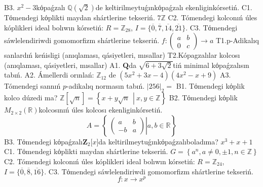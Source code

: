 B3. \(x^{2} - 3\)kόpaǵzalı \(\mathbb{Q}(\sqrt{2})\)de keltirilmeytuǵınkόpaǵzalı ekenliginkórsetiń.
C1. Tόmendegi kόplikti maydan shártlerine tekseriń. \(7\mathbb{Z}\)
C2. Tómendegi kolconıń úles kóplikleri ideal bolıwın kórsetiń:
\(R = \mathbb{Z}_{28}\), \(I = \{\overline{0},\overline{7},\overline{14},\overline{21}\}\).
C3. Tόmendegi sáwlelendiriwdi gomomorfizm shártlerine tekseriń. \(f:\begin{pmatrix}
a & b \\
0 & c
\end{pmatrix} \rightarrow a\)
T1.p-Adikalıq sanlardıń keńisligi (anıqlaması, qásiyetleri, mısallar)
T2.Kópagzalılar kolcosı (anıqlaması, qásiyetleri, mısallar)
A1. \(\mathbf{Q}\)da \(\sqrt{6 + 3\sqrt{2}}\)tiń minimal kόpaǵzalısın tabıń.
A2. Ámellerdi orınlań: \(\mathbb{Z}_{12}\) de \(\left( 5x^{2} + 3x - 4 \right)\left( 4x^{2} - x + 9 \right)\)
A3. Tómendegi sannıń \(p\)-adikalıq normasın tabıń. \(|256|_{2} =\)
B1. Tόmendegi kόplik kolco dúzedi ma? \(\mathbb{Z}\left\lbrack \sqrt{n} \right\rbrack = \left\{ x + y\sqrt{n}\ \ \left| \right.\ x,y \in \mathbb{Z} \right\}\)
B2. Tόmendegi kόplik\(M_{2 \times 2}\left( \mathbb{R} \right)\)kolcosınıń úles kolcosı ekenliginkórsetiń.
\[A = \left\{ \left. \ \begin{pmatrix}
a & b \\
 - b & a
\end{pmatrix} \right|a,b\mathbb{\in R} \right\}\]
B3. Tόmendegi kόpaǵzalı\(\mathbf{Z}_{2}\lbrack x\rbrack\)da keltirilmeytuǵınkόpaǵzalıboladıma? \(x^{3} + x + 1\)
C1. Tόmendegi kόplikti maydan shártlerine tekseriń. \(G = \left\{ a^{n},a \neq 0, \pm 1,n \in \mathbb{Z} \right\}\)
C2. Tómendegi kolconıń úles kóplikleri ideal bolıwın kórsetiń:
\(R = \mathbb{Z}_{24}\), \(I = \{\overline{0},\overline{8},\overline{16}\}\).
C3. Tόmendegi sáwlelendiriwdi gomomorfizm shártlerine tekseriń.
\[f:x \rightarrow x^{p}\]

